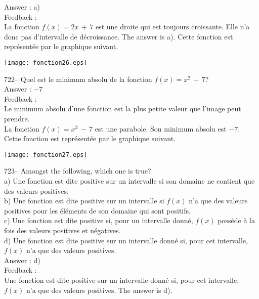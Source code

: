 \documentclass[letterpaper, 12pt]{article}
\begin{document}
Answer : a)\\

Feedback : \\
La fonction $f(x)=2x\,+\,7$ est une droite qui est toujours croissante.
Elle n'a donc pas d'intervalle de d\'ecroissance.  The answer is a).
Cette fonction est repr\'esent\'ee par le graphique suivant.\\
    \begin{center}
    \texttt{[image: fonction26.eps]}
    \end{center}


722-- Quel est le minimum absolu de la fonction $f(x)=x^{2}\,-\,7$?\\

Answer : $-7$\\

Feedback : \\
Le minimum absolu d'une fonction est la plus petite valeur que l'image peut
prendre.\\
La fonction $f(x)=x^{2}\,-\,7$ est une parabole.  Son minimum absolu est
$-7$.  Cette fonction est repr\'esent\'ee par le graphique suivant.\\
    \begin{center}
    \texttt{[image: fonction27.eps]}
    \end{center}


723-- Amongst the following, which one is true?\\
a) Une fonction est dite positive sur un intervalle si son domaine ne
contient que des valeurs positives.\\
b) Une fonction est dite positive sur un intervalle si $f(x)$ n'a que des
valeurs positives pour les \'el\'ements de son domaine qui sont positifs.\\
c) Une fonction est dite positive si, pour un intervalle donn\'e, $f(x)$
poss\`ede \`a la fois des valeurs positives et n\'egatives.\\
d) Une fonction est dite positive sur un intervalle donn\'e si, pour cet
intervalle, $f(x)$ n'a que des valeurs positives.  \\

Answer :  d)\\

Feedback : \\
Une fonction est dite positive sur un intervalle donn\'e si, pour cet
intervalle, $f(x)$ n'a que des valeurs positives. The answer is d).\\
\end{document}
